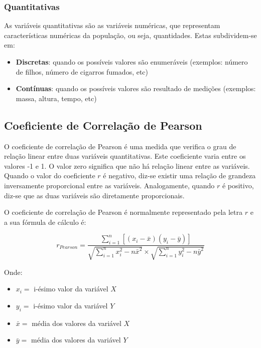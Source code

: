 \documentclass[
]{estat/estat}
\providecommand{\tightlist}{%
  \setlength{\itemsep}{0pt}\setlength{\parskip}{0pt}}\usepackage{longtable,booktabs,array}
\begin{document}
\subsubsection{Quantitativas}\label{quantitativas}

As variáveis quantitativas são as variáveis numéricas, que representam
características numéricas da população, ou seja, quantidades. Estas
subdividem-se em:

\begin{itemize}
\tightlist
\item
  \textbf{Discretas}: quando os possíveis valores são enumeráveis
  (exemplos: número de filhos, número de cigarros fumados, etc)
\item
  \textbf{Contínuas}: quando os possíveis valores são resultado de
  medições (exemplos: massa, altura, tempo, etc)
\end{itemize}

\subsection{Coeficiente de Correlação de
Pearson}\label{coeficiente-de-correlauxe7uxe3o-de-pearson}

O coeficiente de correlação de Pearson é uma medida que verifica o grau
de relação linear entre duas variáveis quantitativas. Este coeficiente
varia entre os valores -1 e 1. O valor zero significa que não há relação
linear entre as variáveis. Quando o valor do coeficiente \(r\) é
negativo, diz-se existir uma relação de grandeza inversamente
proporcional entre as variáveis. Analogamente, quando \(r\) é positivo,
diz-se que as duas variáveis são diretamente proporcionais.

O coeficiente de correlação de Pearson é normalmente representado pela
letra \(r\) e a sua fórmula de cálculo é:

\[
r_{Pearson} = \frac{\displaystyle \sum_{i=1}^{n} \left [ \left(x_i-\bar{x}\right) \left(y_i-\bar{y}\right) \right]}{\sqrt{\displaystyle \sum_{i=1}^{n} x_i^2 - n\bar{x}^2}  \times \sqrt{\displaystyle \sum_{i=1}^{n} y_i^2 - n\bar{y}^2}}
\]

Onde:

\begin{itemize}
\tightlist
\item
  \(x_i =\) i-ésimo valor da variável \(X\)
\item
  \(y_i =\) i-ésimo valor da variável \(Y\)
\item
  \(\bar{x} =\) média dos valores da variável \(X\)
\item
  \(\bar{y} =\) média dos valores da variável \(Y\)
\end{itemize}
\end{document}

